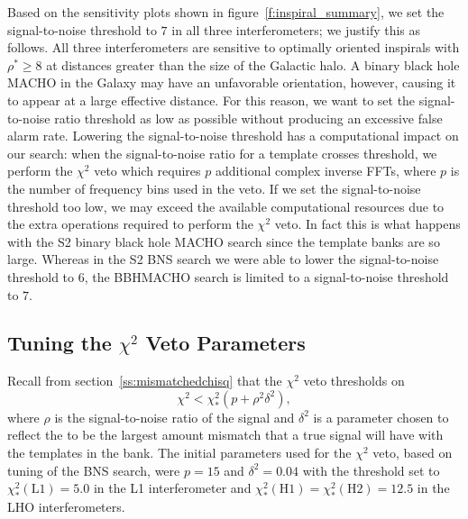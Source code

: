 Based on the sensitivity plots shown in figure~\ref{f:inspiral_summary}, we
set the signal-to-noise threshold to $7$ in all three interferometers; we
justify this as follows. All three interferometers are sensitive to optimally
oriented inspirals with $\rho^\ast \ge 8$ at distances greater than the size
of the Galactic halo. A binary black hole MACHO in the Galaxy may have an
unfavorable orientation, however, causing it to appear at a large effective
distance.  For this reason, we want to set the signal-to-noise ratio threshold
as low as possible without producing an excessive false alarm rate. Lowering
the signal-to-noise threshold has a computational impact on our search:
when the signal-to-noise ratio for a template crosses threshold, we
perform the $\chi^2$ veto which requires $p$ additional complex inverse FFTs,
where $p$ is the number of frequency bins used in the veto. If we set the
signal-to-noise threshold too low, we may exceed the available computational
resources due to the extra operations required to perform the $\chi^2$ veto.
In fact this is what happens with the S2 binary black hole MACHO search since
the template banks are so large. Whereas in the S2 BNS search we were able to
lower the signal-to-noise threshold to $6$, the BBHMACHO search is limited to
a signal-to-noise threshold to $7$.

\subsection{Tuning the $\chi^2$ Veto Parameters}
\label{ss:chisqtuning}


Recall from section~\ref{ss:mismatchedchisq} that the $\chi^2$ veto thresholds
on
\begin{equation}
\chi^2 < \chi^2_\ast (p+\rho^2 \delta^2),
\label{eq:chisqthreshold2}
\end{equation}
where $\rho$ is the signal-to-noise ratio of the signal and $\delta^2$ is a
parameter chosen to reflect the to be the largest amount mismatch that a true
signal will have with the templates in the bank. The initial parameters used
for the $\chi^2$ veto, based on tuning of the BNS search, were $p = 15$ and
$\delta^2 = 0.04$ with the threshold set to $\chi^2_\ast(\mathrm{L1}) = 5.0$ in
the L1 interferometer and $\chi^2_\ast(\mathrm{H1}) = \chi^2_\ast(\mathrm{H2}) =
12.5$ in the LHO interferometers.

